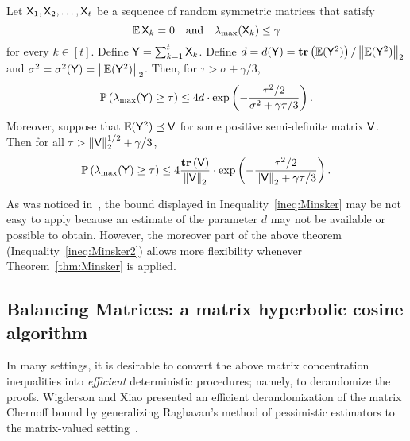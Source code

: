 \begin{theorem}\cite[Theorem~7.3.1 combined with Equation 7.3.2]{Tropp:nips}\label{thm:Minsker}
Let ${\mathsf{X} }_1,{\mathsf{X} }_2, \ldots ,{\mathsf{X} }_t$ be a sequence of random symmetric matrices that satisfy
\[ \operatorname{\mathbb{E}} {\mathsf{X} }_k = 0 \quad \text{and}\quad \lambda_{\max}({\mathsf{X} }_k) \leq \gamma\]
for every $k\in{[t]}$. Define ${\mathsf{Y} } = \sum_{k=1}^{t} {\mathsf{X} }_k$. Define $d = d({\mathsf{Y} }) = \operatorname{\textbf{tr}}\left(\operatorname{\mathbb{E}}( {\mathsf{Y} }^2) \right)/ \left\|\operatorname{\mathbb{E}}({\mathsf{Y} }^2)\right\|_2$ and $\sigma^2 = \sigma^2({\mathsf{Y} }) = \left\|\operatorname{\mathbb{E}}({\mathsf{Y} }^2)\right\|_2$. Then, for $\tau > \sigma + \gamma /3$,
\begin{equation}\label{ineq:Minsker}
	\mathbb{P}\left( \lambda_{\max}({\mathsf{Y} }) \geq \tau \right) \leq 4 d \cdot\hbox{\textrm exp}\left(-\frac{\tau^2/2}{\sigma^2 + \gamma \tau/3}\right).
\end{equation}
Moreover, suppose that $\operatorname{\mathbb{E}}({\mathsf{Y} }^2) \preceq {\ensuremath{\mathsf{V} }}$ for some positive semi-definite matrix ${\mathsf{V} }$. Then for all $\tau> \left\|{\mathsf{V} }\right\|_2^{1/2} + \gamma /3$,
\begin{equation}\label{ineq:Minsker2}
	\mathbb{P}\left( \lambda_{\max}({\mathsf{Y} }) \geq \tau \right) \leq 4 \frac{\operatorname{\textbf{tr}}\left({\mathsf{V} }\right)}{\left\|{\mathsf{V} }\right\|_2} \cdot\hbox{\textrm exp}\left(-\frac{\tau^2/2}{\left\|{\mathsf{V} }\right\|_2 + \gamma \tau/3}\right).
\end{equation}
\end{theorem}
As was noticed in~\cite[p.78]{Tropp:nips}, the bound displayed in Inequality~\eqref{ineq:Minsker} may be not easy to apply because an estimate of the parameter $d$ may not be available or possible to obtain. However, the moreover part of the above theorem (Inequality~\eqref{ineq:Minsker2}) allows more flexibility whenever Theorem~\ref{thm:Minsker} is applied.
\subsection{Balancing Matrices: a matrix hyperbolic cosine algorithm}\label{sec:balancing}
%
In many settings, it is desirable to convert the above matrix concentration inequalities into \emph{efficient} deterministic procedures; namely, to derandomize the proofs. Wigderson and Xiao presented an efficient derandomization of the matrix Chernoff bound by generalizing Raghavan's method of pessimistic estimators to the matrix-valued setting~\cite{chernoff:matrix_valued:derand:WX08}.
%

